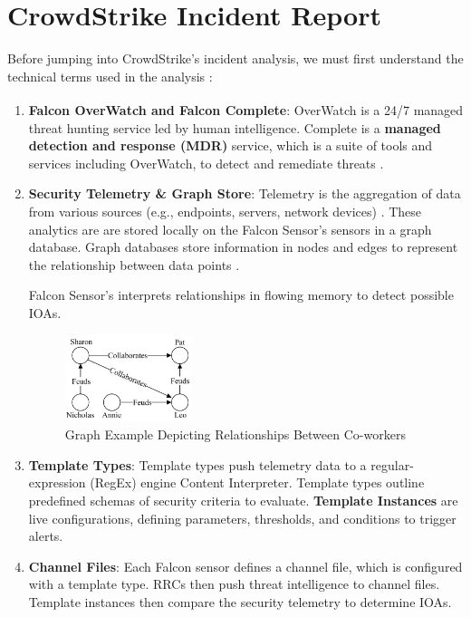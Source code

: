 \section{CrowdStrike Incident Report}

Before jumping into CrowdStrike's incident analysis, we must first understand the technical terms used in the analysis \cite{crowdstrikechannelfile291rca}:

\begin{enumerate}
     \item \textbf{Falcon OverWatch\textsuperscript{\textregistered} and Falcon Complete\textsuperscript{\texttrademark}}: OverWatch is a 24/7 managed threat hunting service led by human 
     intelligence. Complete is a \textbf{managed detection and response (MDR)} service, which is a suite of tools and services including OverWatch, to detect and remediate threats
     \cite{cosive_falcon_complete}\cite{crowdstrike_falcon_complete}\cite{crowdstrike_overwatch}.
     
     \item \textbf{Security Telemetry \& Graph Store}: Telemetry is the aggregation of data from various sources (e.g., endpoints, servers, network devices) \cite{proofpoint_telemetry}. These analytics are
     are stored locally on the Falcon Sensor's sensors in a graph database. Graph databases store information in nodes and edges to represent 
     the relationship between data points \cite{oracle_graph_database}.

     \newpage
     Falcon Sensor's interprets relationships in flowing memory to detect possible IOAs.\\
     \begin{figure}[h!]
        \vspace{-1em}
        \centering
        \includegraphics[width=0.35\textwidth]{Sections/crowd/graph.png}
        \caption{Graph Example Depicting Relationships Between Co-workers}
        \label{fig:graphdb}
        
        \vspace{-1em}
    \end{figure}
    
    \item \textbf{Template Types}: Template types push telemetry data to a regular-expression (RegEx) engine
    Content Interpreter. Template types outline predefined schemas of security criteria to evaluate. \textbf{Template Instances}
    are live configurations, defining parameters, thresholds, and conditions to trigger alerts.
    \item \textbf{Channel Files}: Each Falcon sensor defines a channel file, which is configured with a 
    template type. RRCs then push threat intelligence to channel files. Template instances then compare the security telemetry to 
    determine IOAs.


\end{enumerate}

